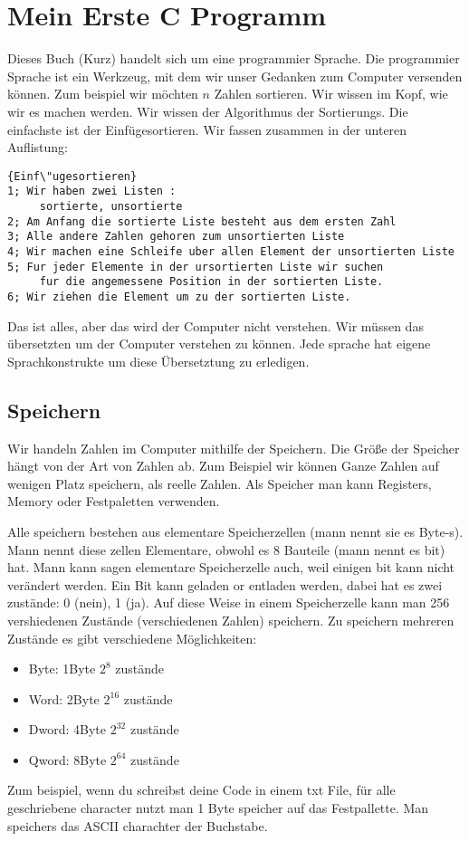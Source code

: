 \documentclass{article}[12pt]
\begin{document}
\section{Mein Erste C Programm}
Dieses Buch (Kurz) handelt sich um eine programmier Sprache. Die programmier Sprache ist ein Werkzeug, mit dem wir unser
Gedanken zum Computer versenden können. Zum beispiel wir möchten $n$ Zahlen sortieren. Wir wissen im Kopf, 
wie wir es machen werden. Wir wissen der Algorithmus der Sortierungs. Die einfachste ist der Einfügesortieren. 
Wir fassen zusammen in
der unteren Auflistung:
\begin{lstlisting}{Einf\"ugesortieren}
1; Wir haben zwei Listen : 
     sortierte, unsortierte
2; Am Anfang die sortierte Liste besteht aus dem ersten Zahl 
3; Alle andere Zahlen gehoren zum unsortierten Liste
4; Wir machen eine Schleife uber allen Element der unsortierten Liste
5; Fur jeder Elemente in der ursortierten Liste wir suchen 
     fur die angemessene Position in der sortierten Liste.
6; Wir ziehen die Element um zu der sortierten Liste.
\end{lstlisting}
Das ist alles, aber das wird der Computer nicht verstehen. Wir müssen das übersetzten um der Computer
verstehen zu können. Jede sprache hat eigene Sprachkonstrukte um diese Übersetztung zu erledigen. 

\subsection{Speichern}
Wir handeln Zahlen im Computer mithilfe der Speichern. Die Größe der Speicher hängt von der Art von Zahlen 
ab. Zum Beispiel wir können Ganze Zahlen auf wenigen Platz speichern, als reelle Zahlen.
Als Speicher man kann Registers, Memory oder Festpaletten verwenden. 

Alle speichern bestehen aus elementare Speicherzellen (mann nennt sie es Byte-s). Mann nennt diese zellen Elementare, obwohl es 8 
Bauteile (mann nennt es  bit) hat. Mann kann sagen elementare Speicherzelle auch, weil einigen
bit kann nicht verändert werden. Ein Bit kann geladen or entladen werden, dabei hat es zwei zustände: 
0 (nein), 1 (ja). Auf diese Weise in einem Speicherzelle kann man 256 vershiedenen Zustände (verschiedenen Zahlen) 
speichern. Zu speichern mehreren Zustände es gibt verschiedene Möglichkeiten:
\begin{itemize}
\item Byte:  1Byte $2^{8 }$ zustände
\item Word:  2Byte $2^{16}$ zustände
\item Dword: 4Byte $2^{32}$ zustände
\item Qword: 8Byte $2^{64}$ zustände
\end{itemize}
Zum beispiel, wenn du schreibst deine Code in einem txt File, für alle geschriebene character nutzt man 1 Byte
speicher auf das Festpallette. Man speichers das ASCII charachter der Buchstabe.  
\end{document}
